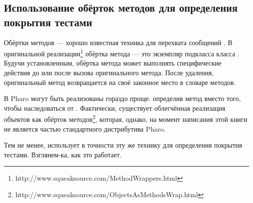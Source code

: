 \documentclass[a4paper,10pt,twoside]{book}
\begin{document}
{%
\subsection{Использование обёрток методов для определения покрытия тестами}

Обёртки методов --- хорошо известная техника для перехвата сообщений \cite{Bran98a}.
В оригинальной реализации\footnote{http://www.squeaksource.com/MethodWrappers.html} обёртка метода --- это экземпляр подкласса класса . Будучи установленным, обёртка метода может выполнять специфические действия до или после вызова оригинального метода.
После удаления, оригинальный метод возвращается на своё законное место в словаре методов.

В Pharo  могут быть реализованы гораздо проще: определив метод  вместо того, чтобы наследоваться от . Фактически, существует облегчённая реализация объектов как обёрток методов\footnote{http://www.squeaksource.com/ObjectsAsMethodsWrap.html}, которая, однако, на момент написания этой книги не является частью стандартного дистрибутива Pharo.

Тем не менее,  использует в точности эту же технику для определения покрытия тестами.
Взглянем-ка, как это работает.

}
\end{document}
